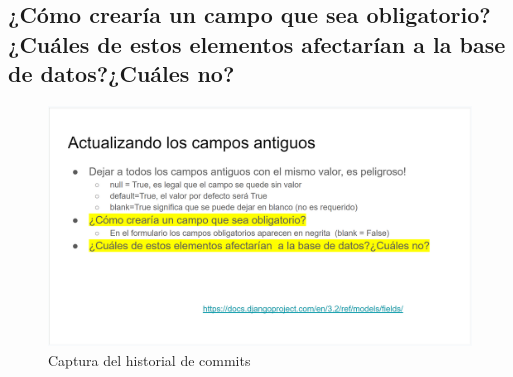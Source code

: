 \documentclass{article}
\begin{document}
        \subsection{¿Cómo crearía un campo que sea obligatorio?¿Cuáles de estos elementos afectarían a la base de datos?¿Cuáles no?}
        \begin{figure}[H]
            \centering
            \includegraphics[width=1\linewidth]{img/Pregunta2.png}
            \caption{Captura del historial de commits}
            \label{fig:enter-label}
        \end{figure}
\end{document}
